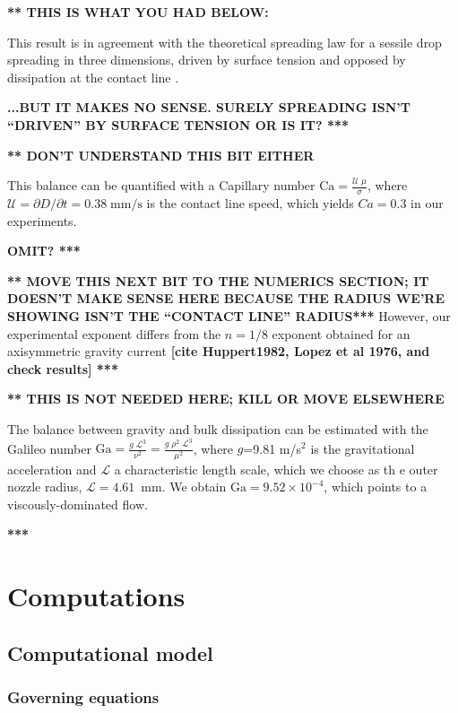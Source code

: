 \documentclass[aip,graphicx]{revtex4-1}
\newcommand{\sym}[1]{\text{#1}} \newcommand{\dif}{\mathrm{d}}
\begin{document}
{\bf *** THIS IS WHAT YOU HAD BELOW:} 

This result is in agreement with the
theoretical spreading law for a sessile drop spreading in three
dimensions, driven by surface tension and opposed by dissipation at
the contact line \cite{bonn2009wetting, cazabat1986dynamics}. 

{\bf ...BUT IT MAKES NO SENSE. SURELY SPREADING ISN'T ``DRIVEN'' BY
SURFACE TENSION OR IS IT? ***}

{\bf *** DON'T UNDERSTAND THIS BIT EITHER}

 This
balance can be quantified with a Capillary number $\displaystyle
\sym{Ca} = \frac{\mathcal{U} \; \mu}{\sigma}$, where
$\mathcal{U}=\partial D/ \partial t=0.38 \; \sym{mm/s}$ is the contact
line speed, which yields $Ca=0.3$ in our experiments.

{\bf OMIT? ***}


{\bf *** MOVE THIS NEXT BIT TO THE NUMERICS SECTION; IT DOESN'T MAKE SENSE
HERE BECAUSE THE RADIUS WE'RE SHOWING ISN'T THE ``CONTACT LINE''
RADIUS*** } However, our
experimental exponent differs from the $n=1/8$ exponent obtained for
an axisymmetric gravity current {\bf [cite Huppert1982, Lopez et al
    1976, and check results] ***} 


{\bf *** THIS IS NOT NEEDED HERE; KILL OR MOVE ELSEWHERE }

The balance between gravity and bulk dissipation can be estimated with
the Galileo number $\displaystyle \sym{Ga} = \frac{g \;
  \mathcal{L}^3}{\nu^2} = \frac{g \; \rho^2 \; \mathcal{L}^3}{\mu^2}$,
where $g$=9.81 m/s$^2$ is the gravitational acceleration and
$\mathcal{L}$ a characteristic length scale, which we choose as th e
outer nozzle radius, $\mathcal{L}=4.61$~mm.  We obtain $\sym{Ga}=9.52
\times 10^{-4}$, which points to a viscously-dominated flow.

{\bf ****}


\section{Computations}

\subsection{Computational model}

\subsubsection{Governing equations}
\end{document}
